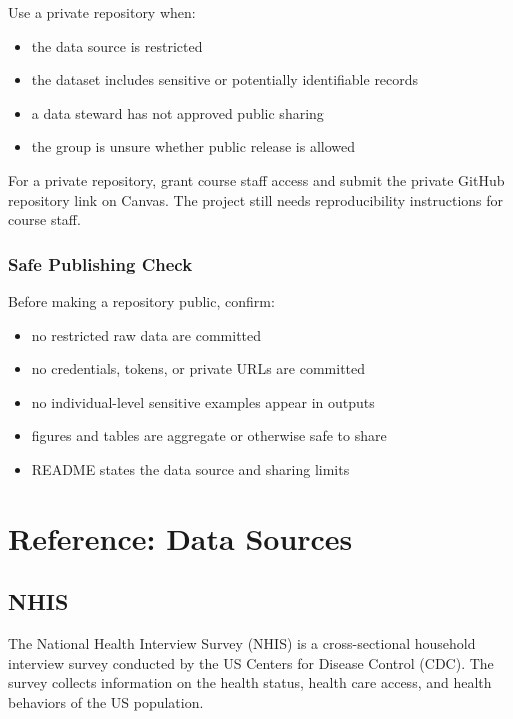 \documentclass[
  letterpaper,
  DIV=11,
  numbers=noendperiod,
  oneside]{scrreprt}
\providecommand{\tightlist}{%
  \setlength{\itemsep}{0pt}\setlength{\parskip}{0pt}}
\begin{document}
Use a private repository when:

\begin{itemize}
\tightlist
\item
  the data source is restricted
\item
  the dataset includes sensitive or potentially identifiable records
\item
  a data steward has not approved public sharing
\item
  the group is unsure whether public release is allowed
\end{itemize}

For a private repository, grant course staff access and submit the
private GitHub repository link on Canvas. The project still needs
reproducibility instructions for course staff.

\section{Safe Publishing Check}\label{safe-publishing-check}

Before making a repository public, confirm:

\begin{itemize}
\tightlist
\item
  no restricted raw data are committed
\item
  no credentials, tokens, or private URLs are committed
\item
  no individual-level sensitive examples appear in outputs
\item
  figures and tables are aggregate or otherwise safe to share
\item
  README states the data source and sharing limits
\end{itemize}

\part{Reference: Data Sources}

\chapter*{NHIS}\label{nhis}


The National Health Interview Survey (NHIS) is a cross-sectional
household interview survey conducted by the US Centers for Disease
Control (CDC). The survey collects information on the health status,
health care access, and health behaviors of the US population.
\end{document}
